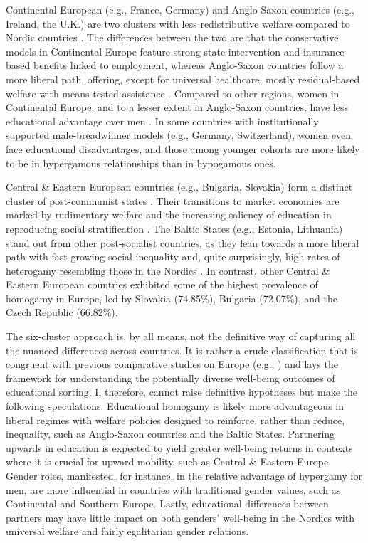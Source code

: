 Continental European (e.g., France, Germany) and Anglo-Saxon countries (e.g., Ireland, the U.K.) are two clusters with less redistributive welfare compared to Nordic countries \parencite{esping-andersenThreeWorldsWelfare1990,esping-andersenWelfareRegimesSocial2015}. The differences between the two are that the conservative models in Continental Europe feature strong state intervention and insurance-based benefits linked to employment, whereas Anglo-Saxon countries follow a more liberal path, offering, except for universal healthcare, mostly residual-based welfare with means-tested assistance \parencite{artsModelsWelfareState2010}. Compared to other regions, women in Continental Europe, and to a lesser extent in Anglo-Saxon countries, have less educational advantage over men \parencite{eratEducationalAssortativeMating2021}. In some countries with institutionally supported male-breadwinner models (e.g., Germany, Switzerland), women even face educational disadvantages, and those among younger cohorts are more likely to be in hypergamous relationships than in hypogamous ones.

Central \& Eastern European countries (e.g., Bulgaria, Slovakia) form a distinct cluster of post-communist states \parencite{castlesWorldsFamiliesRegimes2008}. Their transitions to market economies are marked by rudimentary welfare and the increasing saliency of education in reproducing social stratification \parencite{fengerWelfareRegimesCentral2007,mullerEducationYouthIntegration2005}. The Baltic States (e.g., Estonia, Lithuania) stand out from other post-socialist countries, as they lean towards a more liberal path with fast-growing social inequality and, quite surprisingly, high rates of heterogamy resembling those in the Nordics \parencite{aidukaiteTransformationWelfareSystems2009}. In contrast, other Central \& Eastern European countries exhibited some of the highest prevalence of homogamy in Europe, led by Slovakia (74.85\%), Bulgaria (72.07\%), and the Czech Republic (66.82\%).

The six-cluster approach is, by all means, not the definitive way of capturing all the nuanced differences across countries. It is rather a crude classification that is congruent with previous comparative studies on Europe (e.g., \cite{castlesWorldsFamiliesRegimes2008,schuckDoesIntergenerationalEducational2018}) and lays the framework for understanding the potentially diverse well-being outcomes of educational sorting. I, therefore, cannot raise definitive hypotheses but make the following speculations. Educational homogamy is likely more advantageous in liberal regimes with welfare policies designed to reinforce, rather than reduce, inequality, such as Anglo-Saxon countries and the Baltic States. Partnering upwards in education is expected to yield greater well-being returns in contexts where it is crucial for upward mobility, such as Central \& Eastern Europe. Gender roles, manifested, for instance, in the relative advantage of hypergamy for men, are more influential in countries with traditional gender values, such as Continental and Southern Europe. Lastly, educational differences between partners may have little impact on both genders' well-being in the Nordics with universal welfare and fairly egalitarian gender relations.

